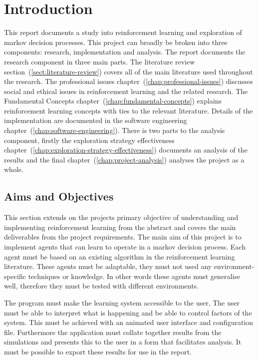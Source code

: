 \documentclass[]{final_report}
\begin{document}

\chapter{Introduction}

This report documents a study into reinforcement learning and exploration of markov decision processes. This project can broadly be broken into three components: research, implementation and analysis. The report documents the research component in three main parts. The literature review section~(\ref{sect:literature-review}) covers all of the main literature used throughout the research. The professional issues chapter~(\ref{chap:professional-issues}) discusses social and ethical issues in reinforcement learning and the related research. The Fundamental Concepts chapter~(\ref{chap:fundamental-concepts}) explains reinforcement learning concepts with ties to the relevant literature. Details of the implementation are documented in the software engineering chapter~(\ref{chap:software-engineering}). There is two parts to the analysis component, firstly the exploration strategy effectiveness chapter~(\ref{chap:exploration-strategy-effectiveness}) documents an analysis of the results and the final chapter~(\ref{chap:project-analysis}) analyses the project as a whole.

\section{Aims and Objectives}

This section extends on the projects primary objective of understanding and implementing reinforcement learning from the abstract and covers the main deliverables from the project requirements. The main aim of this project is to implement agents that can learn to operate in a markov decision process. Each agent must be based on an existing algorithm in the reinforcement learning literature. These agents must be adaptable, they must not used any environment-specific techniques or knowledge. In other words these agents must generalise well, therefore they must be tested with different environments.

The program must make the learning system accessible to the user, The user must be able to interpret what is happening and be able to control factors of the system. This must be achieved with an animated user interface and configuration file. Furthermore the application must collate together results from the simulations and presents this to the user in a form that facilitates analysis. It must be possible to export these results for use in the report. 
\end{document}
